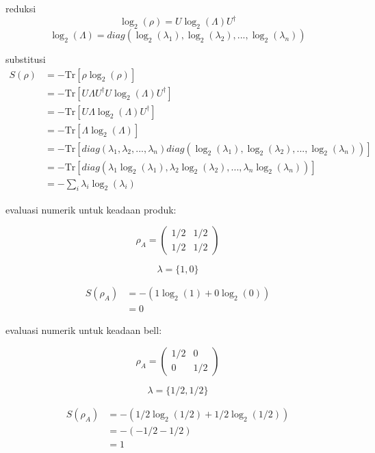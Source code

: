 reduksi
\begin{equation}
    \log_2(\rho) = U \log_2(\Lambda) U^\dagger
\end{equation}
\begin{equation}
    \log_2(\Lambda) = diag(\log_2(\lambda_1), \log_2(\lambda_2), ..., \log_2(\lambda_n))
\end{equation}

substitusi
\begin{equation}
    \begin{split}
    S(\rho) &= -\text{Tr}\left[\rho \log_2(\rho)\right] \\
    &= -\text{Tr}\left[ U \Lambda U^\dagger U \log_2(\Lambda) U^\dagger \right] \\
    &= -\text{Tr}\left[ U \Lambda \log_2(\Lambda) U^\dagger \right] \\
    &= -\text{Tr}\left[ \Lambda \log_2(\Lambda) \right] \\
    &= -\text{Tr}\left[ diag(\lambda_1, \lambda_2, ..., \lambda_n) diag(\log_2(\lambda_1), \log_2(\lambda_2), ..., \log_2(\lambda_n)) \right] \\
    &= -\text{Tr}\left[ diag(\lambda_1 \log_2(\lambda_1), \lambda_2 \log_2(\lambda_2), ..., \lambda_n \log_2(\lambda_n)) \right] \\
    &= -\sum_i \lambda_i \log_2(\lambda_i)
    \end{split}
\end{equation}

evaluasi numerik untuk keadaan produk:

\begin{equation}
    \rho_A = \begin{pmatrix} 1/2 & 1/2 \\ 1/2 & 1/2 \end{pmatrix}
\end{equation}

\begin{equation}
    \lambda = \{1, 0\}
\end{equation}

\begin{equation}
    \begin{split}
    S(\rho_A) &= -(1 \log_2(1) + 0 \log_2(0)) \\
    &= 0
    \end{split}
\end{equation}


evaluasi numerik untuk keadaan bell:

\begin{equation}
    \rho_A = \begin{pmatrix} 1/2 & 0 \\ 0 & 1/2 \end{pmatrix}
\end{equation}

\begin{equation}
    \lambda = \{1/2, 1/2\}
\end{equation}

\begin{equation}
    \begin{split}
    S(\rho_A) &= -(1/2 \log_2(1/2) + 1/2 \log_2(1/2)) \\
    &= -\left( -1/2 - 1/2 \right) \\
    &= 1
    \end{split}
\end{equation}
